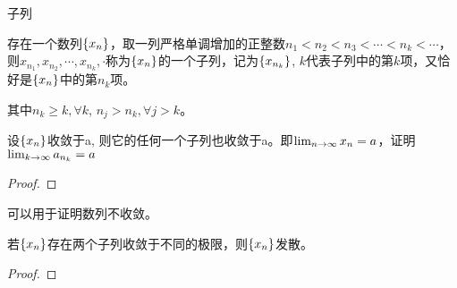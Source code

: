 \documentclass[lang=cn]{elegantbook}
\begin{document}
子列
\begin{definition}
    存在一个数列$\left\{ x_n\right\}$，取一列严格单调增加的正整数$n_1 < n_2 < n_3 < \cdots < n_k < \cdots$，则$x_{n_1}, x_{n_2}, \cdots, x_{n_k}, \cdot$称为$\left\{ x_n\right\}$的一个子列，记为$\left\{ x_{n_k}\right\}$, $k$代表子列中的第$k$项，又恰好是$\left\{ x_n\right\}$中的第$n_k$项。
\end{definition}
其中$n_k \ge k, \forall k$, $n_j > n_k, \forall j > k$。
\begin{theorem}
    设$\left\{ x_n\right\}$收敛于a, 则它的任何一个子列也收敛于a。即$\lim_{n \to \infty } x_n = a$，证明$\lim_{k \to \infty } a_{n_k} = a$
\end{theorem}
\begin{proof}

\end{proof}
可以用于证明数列不收敛。
\begin{proposition}
    若$\left\{ x_n\right\}$存在两个子列收敛于不同的极限，则$\left\{ x_n\right\}$发散。
\end{proposition}
\begin{proof}

\end{proof}
\end{document}
